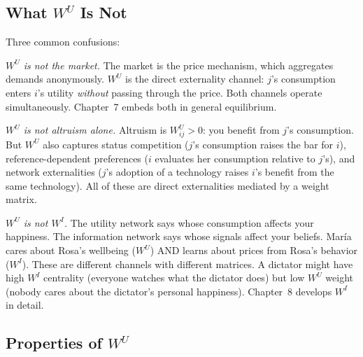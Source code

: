 \documentclass[../structural_economics_book.tex]{subfiles}
\begin{document}
\subsection{What $W^U$ Is Not}

Three common confusions:

\textit{$W^U$ is not the market.} The market is the price mechanism, which aggregates demands anonymously. $W^U$ is the direct externality channel: $j$'s consumption enters $i$'s utility \textit{without} passing through the price. Both channels operate simultaneously. Chapter~7 embeds both in general equilibrium.

\textit{$W^U$ is not altruism alone.} Altruism is $W^U_{ij} > 0$: you benefit from $j$'s consumption. But $W^U$ also captures status competition ($j$'s consumption raises the bar for $i$), reference-dependent preferences ($i$ evaluates her consumption relative to $j$'s), and network externalities ($j$'s adoption of a technology raises $i$'s benefit from the same technology). All of these are direct externalities mediated by a weight matrix.

\textit{$W^U$ is not $W^I$.} The utility network says whose consumption affects your happiness. The information network says whose signals affect your beliefs. Mar\'{i}a cares about Rosa's wellbeing ($W^U$) AND learns about prices from Rosa's behavior ($W^I$). These are different channels with different matrices. A dictator might have high $W^I$ centrality (everyone watches what the dictator does) but low $W^U$ weight (nobody cares about the dictator's personal happiness). Chapter~8 develops $W^I$ in detail.


\subsection{Properties of $W^U$}
\end{document}
